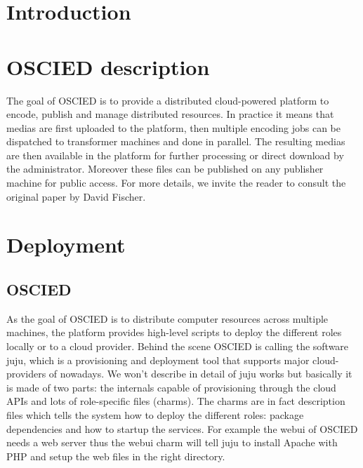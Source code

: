 \documentclass[a4paper,12pt]{article}
\begin{document}
%

\tableofcontents

\newpage

\section{Introduction}

\section{OSCIED description}
The goal of OSCIED is to provide a distributed cloud-powered platform to encode, publish and manage distributed resources.
In practice it means that medias are first uploaded to the platform, then multiple encoding jobs can be dispatched to transformer machines and done in parallel.
The resulting medias are then available in the platform for further processing or direct download by the administrator.
Moreover these files can be published on any publisher machine for public access.
For more details, we invite the reader to consult the original paper by David Fischer. %

\section{Deployment}
\subsection{OSCIED}
As the goal of OSCIED is to distribute computer resources across multiple machines, the platform provides high-level scripts to deploy the different roles locally or to a cloud provider.
Behind the scene OSCIED is calling the software juju, which is a provisioning and deployment tool that supports major cloud-providers of nowadays.
We won't describe in detail of juju works but basically it is made of two parts: the internals capable of provisioning through the cloud APIs and lots of role-specific files (charms).
The charms are in fact description files which tells the system how to deploy the different roles: package dependencies and how to startup the services.
For example the webui of OSCIED needs a web server thus the webui charm will tell juju to install Apache with PHP and setup the web files in the right directory.
\end{document}
